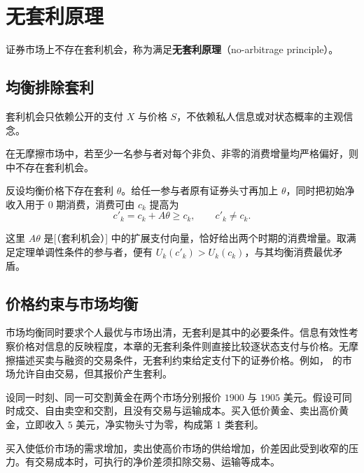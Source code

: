 \section{无套利原理}\label{sec:wj-four-no-arbitrage}
\begin{tcolorbox}[knowledge]
证券市场上不存在套利机会，称为满足\textbf{无套利原理}（no-arbitrage principle）。
\end{tcolorbox}
\subsection{均衡排除套利}
套利机会只依赖公开的支付 $X$ 与价格 $S$，不依赖私人信息或对状态概率的主观信念。

\begin{tcolorbox}[knowledge]
在无摩擦市场中，若至少一名参与者对每个非负、非零的消费增量均严格偏好，则中不存在套利机会。
\end{tcolorbox}

\begin{solution}[label-content={证明},blank-type=none]
反设均衡价格下存在套利 $\theta$。给任一参与者原有证券头寸再加上 $\theta$，同时把初始净收入用于 0 期消费，消费可由 $c_k$ 提高为
\[
 c'_k=c_k+A\theta
 \ge c_k,\qquad c'_k\ne c_k.
\]

这里 $A\theta$ 是[（套利机会）] 中的扩展支付向量，恰好给出两个时期的消费增量。取满足定理单调性条件的参与者，便有 $U_k(c'_k)>U_k(c_k)$，与其均衡消费最优矛盾。
\end{solution}

\subsection{价格约束与市场均衡}
市场均衡同时要求个人最优与市场出清，无套利是其中的必要条件。信息有效性考察价格对信息的反映程度，本章的无套利条件则直接比较逐状态支付与价格。无摩擦描述买卖与融资的交易条件，无套利约束给定支付下的证券价格。例如， 的市场允许自由交易，但其报价产生套利。

\begin{tcolorbox}[example,title=课堂例题：跨市场的一价定律]
设同一时刻、同一可交割黄金在两个市场分别报价 $1900$ 与 $1905$ 美元。假设可同时成交、自由卖空和交割，且没有交易与运输成本。买入低价黄金、卖出高价黄金，立即收入 $5$ 美元，净实物头寸为零，构成第 1 类套利。
\end{tcolorbox}
买入使低价市场的需求增加，卖出使高价市场的供给增加，价差因此受到收窄的压力。有交易成本时，可执行的净价差须扣除交易、运输等成本。

